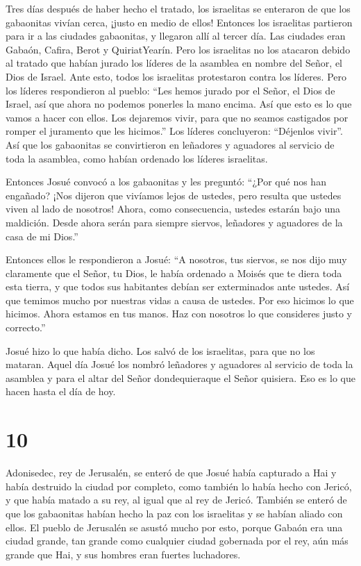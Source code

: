  Tres días después de haber hecho el tratado, los
israelitas se enteraron de que los gabaonitas vivían cerca, ¡justo en
medio de ellos!  Entonces los israelitas partieron para ir
a las ciudades gabaonitas, y llegaron allí al tercer día. Las ciudades
eran Gabaón, Cafira, Berot y QuiriatYearín.  Pero los
israelitas no los atacaron debido al tratado que habían jurado los
líderes de la asamblea en nombre del Señor, el Dios de Israel. Ante
esto, todos los israelitas protestaron contra los líderes. 
Pero los líderes respondieron al pueblo: ``Les hemos jurado por el
Señor, el Dios de Israel, así que ahora no podemos ponerles la mano
encima.  Así que esto es lo que vamos a hacer con ellos.
Los dejaremos vivir, para que no seamos castigados por romper el
juramento que les hicimos.''  Los líderes concluyeron:
``Déjenlos vivir''. Así que los gabaonitas se convirtieron en leñadores
y aguadores al servicio de toda la asamblea, como habían ordenado los
líderes israelitas.

 Entonces Josué convocó a los gabaonitas y les preguntó:
``¿Por qué nos han engañado? ¡Nos dijeron que vivíamos lejos de ustedes,
pero resulta que ustedes viven al lado de nosotros!  Ahora,
como consecuencia, ustedes estarán bajo una maldición. Desde ahora serán
para siempre siervos, leñadores y aguadores de la casa de mi Dios.''

 Entonces ellos le respondieron a Josué: ``A nosotros, tus
siervos, se nos dijo muy claramente que el Señor, tu Dios, le había
ordenado a Moisés que te diera toda esta tierra, y que todos sus
habitantes debían ser exterminados ante ustedes. Así que temimos mucho
por nuestras vidas a causa de ustedes. Por eso hicimos lo que hicimos.
 Ahora estamos en tus manos. Haz con nosotros lo que
consideres justo y correcto.''

 Josué hizo lo que había dicho. Los salvó de los
israelitas, para que no los mataran.  Aquel día Josué los
nombró leñadores y aguadores al servicio de toda la asamblea y para el
altar del Señor dondequieraque el Señor quisiera. Eso es lo que hacen
hasta el día de hoy.

\hypertarget{section-9}{%
\section{10}\label{section-9}}

 Adonisedec, rey de Jerusalén, se enteró de que Josué había
capturado a Hai y había destruido la ciudad por completo, como también
lo había hecho con Jericó, y que había matado a su rey, al igual que al
rey de Jericó. También se enteró de que los gabaonitas habían hecho la
paz con los israelitas y se habían aliado con ellos.  El
pueblo de Jerusalén se asustó mucho por esto, porque Gabaón era una
ciudad grande, tan grande como cualquier ciudad gobernada por el rey,
aún más grande que Hai, y sus hombres eran fuertes luchadores.

